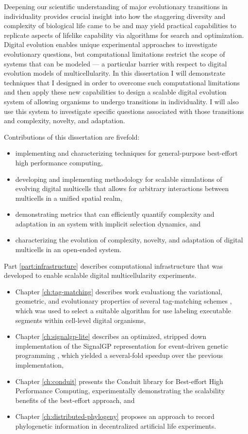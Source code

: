 Deepening our scientific understanding of major evolutionary transitions in individuality provides crucial insight into how the staggering diversity and complexity of biological life came to be and may yield practical capabilities to replicate aspects of lifelike capability via algorithms for search and optimization.
Digital evolution enables unique experimental approaches to investigate evolutionary questions, but computational limitations restrict the scope of systems that can be modeled --- a particular barrier with respect to digital evolution models of multicellularity.
In this dissertation I will demonstrate techniques that I designed in order to overcome such computational limitations and then apply these new capabilities to design a scalable digital evolution system of allowing organisms to undergo transitions in individuality.
I will also use this system to investigate specific questions associated with those transitions and complexity, novelty, and adaptation.

Contributions of this dissertation are fivefold:
\begin{itemize}
\item implementing and characterizing techniques for general-purpose best-effort high performance computing,
\item developing and implementing methodology for scalable simulations of evolving digital multicells that allows for arbitrary interactions between multicells in a unified spatial realm,
\item demonstrating metrics that can efficiently quantify complexity and adaptation in an system with implicit selection dynamics, and
\item characterizing the evolution of complexity, novelty, and adaptation of digital multicells in an open-ended system.
\end{itemize}

Part \ref{part:infrastructure} describes computational infrastructure that was developed to enable scalable digital multicellularity experiments.
\begin{itemize}
\item Chapter \ref{ch:tag-matching} describes work evaluationg the variational, geometric, and evolutionary properties of several tag-matching schemes \cite{lalejini2018evolving}, which was used to select a suitable algorithm for use labeling executable segments within cell-level digital organisms,
\item Chapter \ref{ch:signalgp-lite} describes an optimized, stripped down implementation of the SignalGP representation for event-driven genetic programming \cite{lalejini2018evolving}, which yielded a several-fold speedup over the previous implementation,
\item Chapter \ref{ch:conduit} presents the Conduit library for Best-effort High Performance Computing, experimentally demonstrating the scalability benefits of the best-effort approach, and
\item Chapter \ref{ch:distributed-phylogeny} proposes an approach to record phylogenetic information in decentralized artificial life experiments.
\end{itemize}

